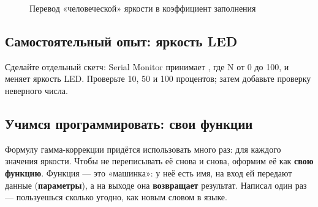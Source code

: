 \begin{figure}[H]
\centering
{}
\caption{Перевод «человеческой» яркости в коэффициент заполнения}
\end{figure}

\subsection{Самостоятельный опыт: яркость LED}

Сделайте отдельный скетч: Serial Monitor принимает , где N от 0 до 100, и меняет
яркость LED. Проверьте 10, 50 и 100 процентов; затем добавьте проверку неверного числа.

\subsection{Учимся программировать: свои функции}

Формулу гамма-коррекции придётся использовать много раз: для каждого значения яркости. Чтобы не
переписывать её снова и снова, оформим её как \textbf{свою функцию}. Функция --- это «машинка»: у неё есть имя,
на вход ей передают данные (\textbf{параметры}), а на выходе она \textbf{возвращает} результат. Написал один
раз --- пользуешься сколько угодно, как новым словом в языке.

